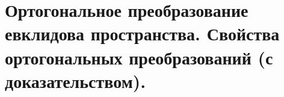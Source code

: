 \section{
    Ортогональное преобразование евклидова пространства. Свойства ортогональных преобразований (с доказательством).
}



